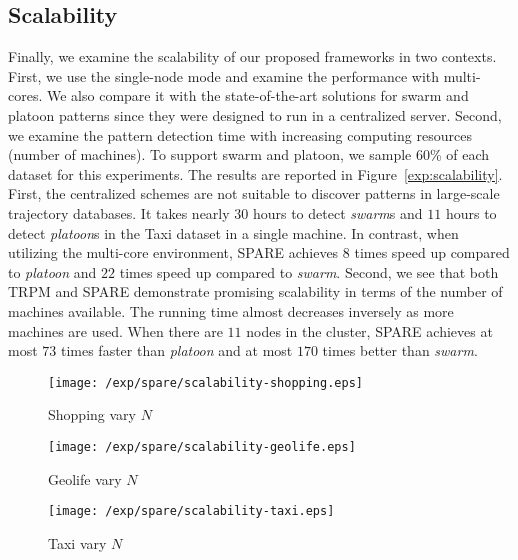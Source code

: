 \subsection{Scalability}
Finally, we examine the scalability of our proposed frameworks in two contexts. 
First, we use the single-node mode and examine the performance with multi-cores. 
We also compare it with the state-of-the-art solutions for swarm and platoon patterns 
since they were designed to run in a centralized server. 
Second, we examine the pattern detection time with increasing computing resources (number of machines). 
To support swarm and platoon, we sample 60\% of each dataset for this experiments. 
The results are reported in Figure~\ref{exp:scalability}. 
First, the centralized schemes are not suitable to discover patterns in 
large-scale trajectory databases. It takes nearly $30$ hours to 
detect \emph{swarm}s and $11$ hours to detect \emph{platoon}s in the Taxi dataset in a single machine. 
In contrast, when utilizing the multi-core environment, 
SPARE achieves $8$ times speed up compared to \emph{platoon} and $22$ times speed up compared to \emph{swarm}. 
Second, we see that both TRPM and SPARE demonstrate promising scalability in terms of the number of machines available. The running time almost decreases inversely as more machines are used. 
When there are $11$ nodes in the cluster, 
SPARE achieves at most $73$ times faster 
than \emph{platoon} and at most $170$ times better than \emph{swarm}.

\begin{figure*}[t]
\centering
\begin{subfigure}[b]{0.31\textwidth}
    \texttt{[image: /exp/spare/scalability-shopping.eps]}
        \caption{Shopping vary $N$}
    \end{subfigure}
 	 \begin{subfigure}[b]{0.31\textwidth}
        \texttt{[image: /exp/spare/scalability-geolife.eps]}
        \caption{Geolife vary $N$}
    \end{subfigure}
    	 \begin{subfigure}[b]{0.31\textwidth}
        \texttt{[image: /exp/spare/scalability-taxi.eps]}
        \caption{Taxi vary $N$}
    \end{subfigure}
 \caption{Comparisons among TRMP, SPARE, PLATOON and SWARM.}
 \label{exp:scalability}
\end{figure*}
